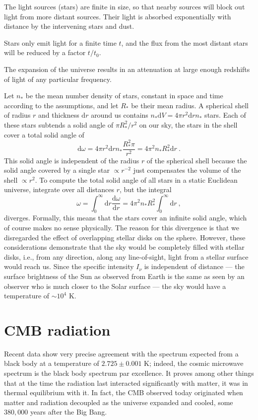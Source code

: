 \documentclass[12pt,a4paper]{article}
\newcommand{\dif}{\mathrm{d}}
\begin{document}
The light sources (stars) are finite in size, so that nearby sources will block out light from more distant sources. Their light is absorbed exponentially with distance by the intervening stars and dust.

Stars only emit light for a finite time $t$, and the flux from the most distant stars will be reduced by a factor $t/t_0$.

The expansion of the universe results in an attenuation at large enough redshifts of light of any particular frequency.

\cite{2015eaci.book.....S} Let $n_\ast$ be the mean number density of stars, constant in space and time according to the assumptions, and let $R_\ast$ be their mean radius. A spherical shell of radius $r$ and thickness $\dif r$ around us contains $n_\ast \dif V = 4\pi r^2  \dif r n_\ast$ stars. Each of these stars subtends a solid angle of $\pi R_\ast^2/ r^2$ on our sky, the stars in the shell cover a total solid angle of
\begin{equation}
\dif \omega = 4\pi r^2 \dif r n_\ast \dfrac{R_\ast^2 \pi}{r^2} = 4\pi^2 n_\ast R_\ast^2 \dif r ~.
\end{equation}
This solid angle is independent of the radius $r$ of the spherical shell because the solid angle covered by a single star $\propto r^{-2}$ just compensates the volume of the shell $\propto r^2$. To compute the total solid angle of all stars in a static Euclidean universe, integrate over all distances $r$, but the integral
\begin{equation}
\omega = \int_0^\infty \dif r \dfrac{\dif \omega}{\dif r} = 4\pi^2 n_\ast R_\ast^2 \int_0^\infty \dif r ~,
\end{equation}
diverges. Formally, this means that the stars cover an infinite solid angle, which of course makes no sense physically. The reason for this divergence is that we disregarded the effect of overlapping stellar disks on the sphere. However, these considerations demonstrate that the sky would be completely filled with stellar disks, i.e., from any direction, along any line-of-sight, light from a stellar surface would reach us. Since the specific intensity $I_\nu$ is independent of distance --- the surface brightness of the Sun as observed from Earth is the same as seen by an observer who is much closer to the Solar surface --- the sky would have a temperature of $\sim 10^4$ K.





\section{CMB radiation}
\cite{perkins2008particle} Recent data show very precise agreement with the spectrum expected from a black body at a temperature of $2.725 \pm 0.001$ K; indeed, the cosmic microwave spectrum is the black body spectrum par excellence. It proves among other things that at the time the radiation last interacted significantly with matter, it was in thermal equilibrium with it. In fact, the CMB observed today originated when matter and radiation decoupled as the universe expanded and cooled, some $380,000$ years after the Big Bang.
\end{document}
